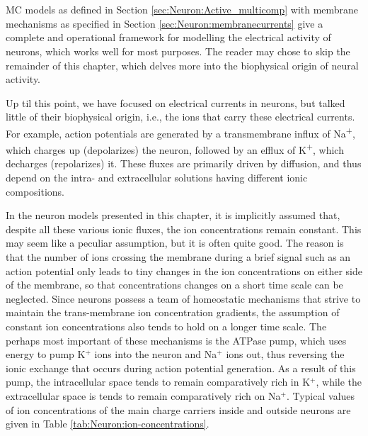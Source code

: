 

\section{}
\label{sec:Neuron:Ions_and_reversals}
MC models as defined in Section \ref{sec:Neuron:Active_multicomp} with membrane mechanisms as specified in Section \ref{sec:Neuron:membranecurrents} give a complete and operational framework for modelling the electrical activity of neurons, which works well for most purposes. The reader may chose to skip the remainder of this chapter, which delves more into the biophysical origin of neural activity. 

Up til this point, we have focused on electrical currents in neurons, but talked little of their biophysical origin, i.e., the ions that carry these electrical currents. For example, action potentials are generated by a transmembrane influx of Na\textsuperscript{+}, which charges up (depolarizes) the neuron, followed by an efflux of K\textsuperscript{+}, which decharges (repolarizes) it. These fluxes are primarily driven by diffusion, and thus depend on the intra- and extracellular solutions having different ionic compositions. 

In the neuron models presented in this chapter, it is implicitly assumed that, despite all these various ionic fluxes, the ion concentrations remain constant. This may seem like a peculiar assumption, but it is often quite good. The reason is that the number of ions crossing the membrane during a brief signal such as an action potential only leads to tiny changes in the ion concentrations on either side of the membrane, so that concentrations changes on a short time scale can be neglected. Since neurons possess a team of homeostatic mechanisms that strive to maintain the trans-membrane ion concentration gradients, the assumption of constant ion concentrations also tends to hold on a longer time scale.  The perhaps most important of these mechanisms is the ATPase pump, which uses energy to pump K$^+$ ions into the neuron and Na$^+$ ions out, thus reversing the ionic exchange that occurs during action potential generation. As a result of this pump, the intracellular space tends to remain comparatively rich in K$^+$, while the extracellular space is tends to remain comparatively rich on Na$^+$. Typical values of ion concentrations of the main charge carriers inside and outside neurons are given in Table \ref{tab:Neuron:ion-concentrations}. 

